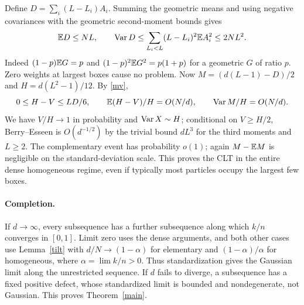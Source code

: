 \documentclass[11pt]{article}
\begin{document}
Define $D=\sum_i(L-L_i)A_i$. Summing the geometric means and using negative covariances with the geometric second-moment bounds gives
\[
\mathbb E D\le NL,\qquad
\operatorname{Var} D\le\sum_{L_i<L}(L-L_i)^2 \mathbb E A_i^2\le2 NL^2.
\]
Indeed $(1-p)\mathbb E G=p$ and $(1-p)^2\mathbb E G^2=p(1+p)$ for a geometric $G$ of ratio $p$. Zero weights at largest boxes cause no problem. Now $M=(d(L-1)-D)/2$ and $H=d(L^2-1)/12$. By \eqref{mv},
\[
0\le H-V\le LD/6,\qquad
\mathbb E(H-V)/H=O(N/d),\qquad\operatorname{Var} M/H=O(N/d).
\]
We have $V/H\to1$ in probability and $\operatorname{Var} X\sim H$; conditional on $V\ge H/2$, Berry--Esseen is $O(d^{-1/2})$ by the trivial bound $dL^3$ for the third moments and $L\ge2$. The complementary event has probability $o(1)$; again $M-\mathbb E M$ is negligible on the standard-deviation scale. This proves the CLT in the entire dense homogeneous regime, even if typically most particles occupy the largest few boxes.
\paragraph{Completion.} If $d\to\infty$, every subsequence has a further subsequence along which $k/n$ converges in $[0,1]$. Limit zero uses the dense arguments, and both other cases use Lemma~\ref{tilt} with $d/N\to(1-\alpha)$ for elementary and $(1-\alpha)/\alpha$ for homogeneous, where $\alpha=\lim k/n>0$. Thus standardization gives the Gaussian limit along the unrestricted sequence. If $d$ fails to diverge, a subsequence has a fixed positive defect, whose standardized limit is bounded and nondegenerate, not Gaussian. This proves Theorem~\ref{main}.
\end{document}
